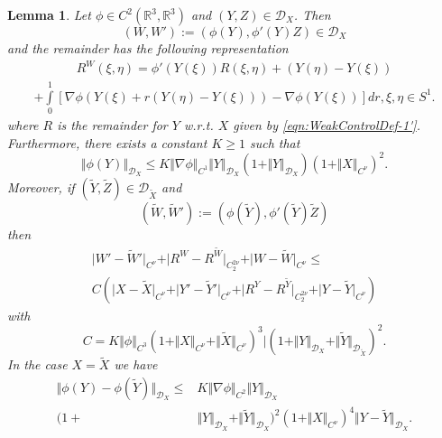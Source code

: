 \documentclass[11pt,a4paper,leqno]{amsart}%
\theoremstyle{plain}
\theoremstyle{remark}
\theoremstyle{plain}
\newtheorem{lemma}[theorem]{Lemma}
\numberwithin{equation}{section}
\def\Rnu{{\mathbb R}}
\def\intl{\int\limits}
\begin{document}
\begin{lemma}\label{lem:RegularMap}
Let $\phi\in C^2(\Rnu^3,\Rnu^3)$ and $(Y,Z)\in \mathcal{D}_X$.
Then
\begin{equation}
(W,W'):=(\phi(Y),\phi'(Y)Z)\in
\mathcal{D}_X\label{eqn:RegularMap-1}
\end{equation}
and the remainder has the following representation
\begin{eqnarray}
R^{W}(\xi,\eta)=\phi'(Y(\xi))R(\xi,\eta)+
(Y(\eta)-Y(\xi))\nonumber
\end{eqnarray}
\begin{eqnarray}
+\intl_0^1[\nabla\phi(Y(\xi)+r(Y(\eta)-Y(\xi)))-\nabla\phi(Y(\xi))]dr,\xi,\eta\in
S^1.\label{eqn:RegularMap-2}
\end{eqnarray}
where $R$ is the remainder for $Y$ w.r.t. $X$ given by
\eqref{eqn:WeakControlDef-1'}. Furthermore, there exists a
constant $K\geq 1$ such that
\begin{equation}
\Vert \phi(Y)\Vert_{\mathcal{D}_X}\leq
K\Vert \nabla\phi\Vert_{C^1}\Vert Y\Vert_{\mathcal{D}_X}(1+\Vert Y\Vert_{\mathcal{D}_X})(1+\Vert X\Vert_{C^{\nu}})^2.\label{eqn:RegularMap-3}
\end{equation}
Moreover, if $(\tilde{Y},\tilde{Z})\in \mathcal{D}_{\tilde{X}}$
and
$$
(\tilde{W},\tilde{W}'):=(\phi(\tilde{Y}),\phi'(\tilde{Y})\tilde{Z})
$$
then
\begin{equation}
\begin{split}
\label{eqn:RegularMap-4}
\vert W'-\tilde{W}'\vert_{C^{\nu}}+\vert R^W-R^{\tilde{W}}\vert_{C_2^{2\nu}}+\vert W-\tilde{W}\vert_{C^{\nu}}\leq\\
C(\vert X-\tilde{X}\vert_{C^{\nu}}+\vert Y'-\tilde{Y}'\vert_{C^{\nu}}+\vert R^Y-R^{\tilde{Y}}\vert_{C_2^{2\nu}}+\vert Y-\tilde{Y}\vert_{C^{\nu}})
\end{split}
\end{equation}
with
\begin{equation}
C=K\Vert \phi\Vert_{C^3}(1+\Vert X\Vert_{C^{\nu}}+\Vert \tilde{X}\Vert_{C^{\nu}})^3\vert (1+\Vert Y\Vert_{\mathcal{D}_X}+\Vert \tilde{Y}\Vert_{\mathcal{D}_{\tilde{X}}})^2.\label{eqn:RegularMap-4'}
\end{equation}
In the case $X=\tilde{X}$ we have
\begin{equation}
\label{eqn:RegularMap-4''}
\begin{split}
\Vert \phi(Y)-\phi(\tilde{Y})\Vert_{\mathcal{D}_X}\leq
& K\Vert \nabla\phi\Vert_{C^2}\Vert Y\Vert_{\mathcal{D}_X}\\ 
(1+&\Vert Y\Vert_{\mathcal{D}_X}+\Vert \tilde{Y}\Vert_{\mathcal{D}_X})^2(1+\Vert X\Vert_{C^{\nu}})^4
\Vert Y-\tilde{Y}\Vert_{\mathcal{D}_X}.
\end{split}
\end{equation}
\end{lemma}
\end{document}
